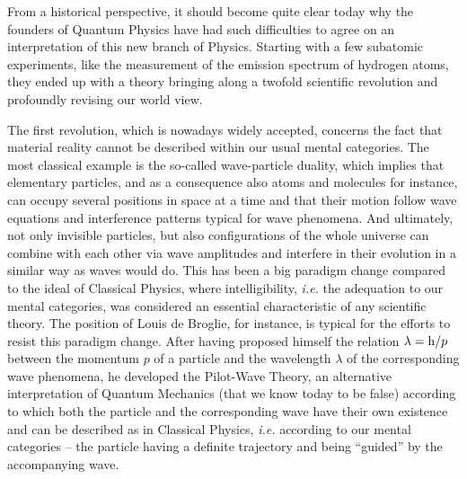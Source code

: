 From a historical perspective, it should become quite clear today why the founders of Quantum Physics have had such difficulties to agree on an interpretation of this new branch of Physics.
Starting with a few subatomic experiments, like the measurement of the emission spectrum of hydrogen atoms, they ended up with a theory bringing along a twofold scientific revolution and profoundly revising our world view.

The first revolution, which is nowadays widely accepted, concerns the fact that material reality cannot be described within our usual mental categories.
The most classical example is the so-called wave-particle duality, which implies that elementary particles, and as a consequence also atoms and molecules for instance, can occupy several positions in space at a time and that their motion follow wave equations and interference patterns typical for wave phenomena.
And ultimately, not only invisible particles, but also configurations of the whole universe can combine with each other via wave amplitudes and interfere in their evolution in a similar way as waves would do.
This has been a big paradigm change compared to the ideal of Classical Physics, where intelligibility, \textit{i.e.} the adequation to our mental categories, was considered an essential characteristic of any scientific theory.
The position of Louis de Broglie, for instance, is typical for the efforts to resist this paradigm change.
After having proposed himself the relation $\lambda = \mathrm h / p$ between the momentum $p$ of a particle and the wavelength $\lambda$ of the corresponding wave phenomena, he developed the Pilot-Wave Theory, an alternative interpretation of Quantum Mechanics (that we know today to be false) according to which both the particle and the corresponding wave have their own existence and can be described as in Classical Physics, \textit{i.e.} according to our mental categories -- the particle having a definite trajectory and being ``guided'' by the accompanying wave.

